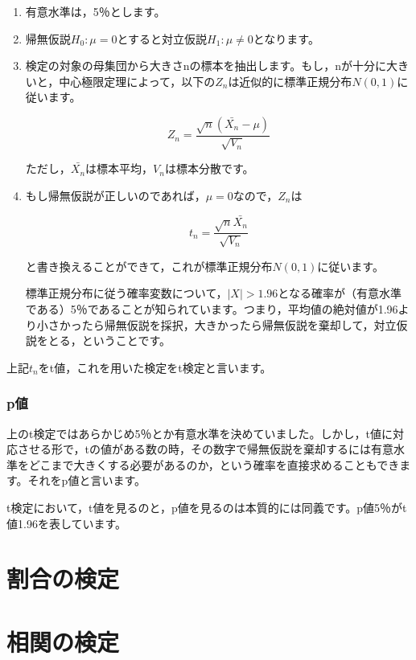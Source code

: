 \documentclass[
  letterpaper,
  DIV=11,
  numbers=noendperiod]{scrreprt}
\begin{document}
\begin{enumerate}
\def\labelenumi{\arabic{enumi}.}
\item
  有意水準は，5％とします。
\item
  帰無仮説\(H_0 : \mu = 0\)とすると対立仮説\(H_1 : \mu \ne 0\)となります。
\item
  検定の対象の母集団から大きさnの標本を抽出します。もし，nが十分に大きいと，中心極限定理によって，以下の\(Z_n\)は近似的に標準正規分布\(N(0,1)\)に従います。

  \[
  Z_n = \frac{\sqrt{n}(\bar{X_n} - \mu)}{\sqrt{V_n}}
  \]

  ただし，\(\bar{X_n}\)は標本平均，\(V_n\)は標本分散です。
\item
  もし帰無仮説が正しいのであれば，\(\mu = 0\)なので，\(Z_n\)は

  \[
  t_n = \frac{\sqrt{n}\bar{X_n}}{\sqrt{V_n}}
  \]

  と書き換えることができて，これが標準正規分布\(N(0,1)\)に従います。

  標準正規分布に従う確率変数について，\(|X|>1.96\)となる確率が（有意水準である）5％であることが知られています。つまり，平均値の絶対値が1.96より小さかったら帰無仮説を採択，大きかったら帰無仮説を棄却して，対立仮説をとる，ということです。
\end{enumerate}

上記\(t_n\)をt値，これを用いた検定をt検定と言います。

\hypertarget{pux5024}{%
\subsection{p値}\label{pux5024}}

上のt検定ではあらかじめ5％とか有意水準を決めていました。しかし，t値に対応させる形で，tの値がある数の時，その数字で帰無仮説を棄却するには有意水準をどこまで大きくする必要があるのか，という確率を直接求めることもできます。それをp値と言います。

t検定において，t値を見るのと，p値を見るのは本質的には同義です。p値5％がt値1.96を表しています。

\hypertarget{ux5272ux5408ux306eux691cux5b9a}{%
\chapter{割合の検定}\label{ux5272ux5408ux306eux691cux5b9a}}

\hypertarget{ux76f8ux95a2ux306eux691cux5b9a}{%
\chapter{相関の検定}\label{ux76f8ux95a2ux306eux691cux5b9a}}
\end{document}
